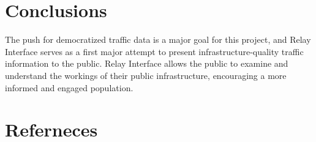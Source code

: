 \documentclass[a4paper,11pt]{report}
\begin{document}
\begin{multicols}{2}
\section{Conclusions}

The push for democratized traffic data is a major goal for this project, and Relay Interface serves as a first major attempt to present infrastructure-quality traffic information to the public. Relay Interface allows the public to examine and understand the workings of their public infrastructure, encouraging a more informed and engaged population.

\section{Referneces}




\end{multicols}
\end{document}
